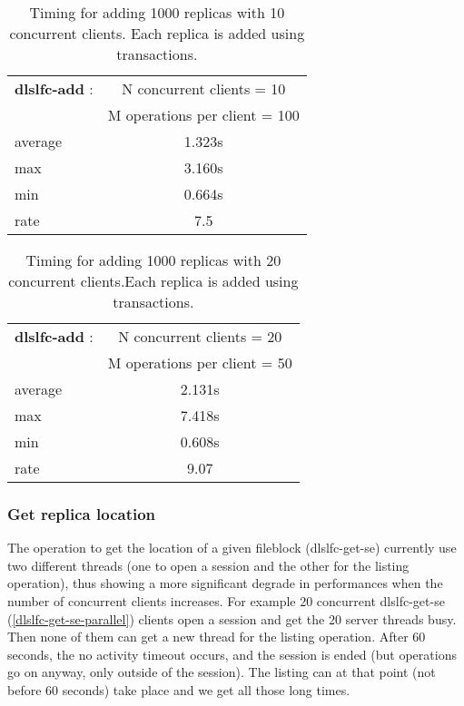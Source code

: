 \documentclass[pdftex]{cmspaper}
\begin{document}
\begin{table}[!htbp]
\begin{center}
 \begin{tabular}{|l|c|}         \hline
   {\bf dlslfc-add} : & N concurrent clients = 10  \\
   & M operations per client = 100\\ \hline
    average &  1.323s \\ \hline
    max & 3.160s \\ \hline
    min &  0.664s \\ \hline
    rate  & 7.5 \\ \hline
\end{tabular}
\caption {Timing for adding 1000 replicas with 10 concurrent clients. Each replica is added using transactions.}\label{dlslfc-add}
\end{center}
\end{table}

\begin{table}[!htbp]
\begin{center}
 \begin{tabular}{|l|c|}         \hline
   {\bf dlslfc-add} : & N concurrent clients = 20  \\ 
 & M operations per client = 50\\ \hline
    average &  2.131s \\ \hline
    max & 7.418s \\ \hline
    min & 0.608s \\ \hline
    rate  & 9.07 \\ \hline 
\end{tabular}
\caption {Timing for adding 1000 replicas with 20 concurrent clients.Each replica is added using transactions.}\label{dlslfc-add}
\end{center}
\end{table}

\subsubsection{Get replica location}

The operation to get the location of a given fileblock (dlslfc-get-se)
currently use two different threads (one to open a session and the other
for the listing operation), thus showing a more significant degrade
in performances when the number of concurrent clients increases.
For example 20 concurrent dlslfc-get-se (\ref{dlslfc-get-se-parallel})
clients open a session and get the 20 server threads busy.
Then none of them can get a new thread for the listing operation.
After 60 seconds, the no activity timeout occurs, and the session
is ended (but operations go on anyway, only outside of the session).
The listing can at that point (not before 60 seconds) take place
and we get all those long times.
\end{document}
